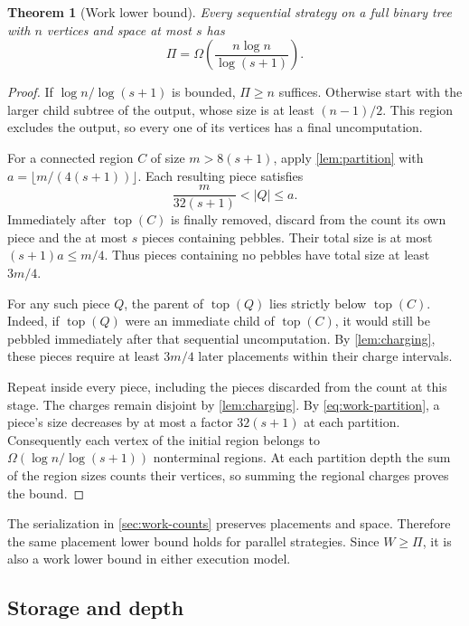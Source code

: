 \documentclass[11pt]{article}
\newtheorem{theorem}{Theorem}[section]
\theoremstyle{definition}
\theoremstyle{remark}
\DeclareMathOperator{\topv}{top}
\begin{document}
\begin{theorem}[Work lower bound]
\label{thm:universal-work}
Every sequential strategy on a full binary tree with $n$ vertices and space at most $s$ has
\begin{equation}
\Pi=\Omega\!\left(\frac{n\log n}{\log(s+1)}\right).
\label{eq:universal-work}
\end{equation}
\end{theorem}
\begin{proof}
If $\log n/\log(s+1)$ is bounded, $\Pi\ge n$ suffices. Otherwise start with the larger child subtree of the output, whose size is at least $(n-1)/2$. This region excludes the output, so every one of its vertices has a final uncomputation.

For a connected region $C$ of size $m>8(s+1)$, apply \cref{lem:partition} with $a=\lfloor m/(4(s+1))\rfloor$. Each resulting piece satisfies
\begin{equation}
 \frac{m}{32(s+1)}<|Q|\le a.
 \label{eq:work-partition}
\end{equation}
Immediately after $\topv(C)$ is finally removed, discard from the count its own piece and the at most $s$ pieces containing pebbles. Their total size is at most $(s+1)a\le m/4$. Thus pieces containing no pebbles have total size at least $3m/4$.

For any such piece $Q$, the parent of $\topv(Q)$ lies strictly below $\topv(C)$. Indeed, if $\topv(Q)$ were an immediate child of $\topv(C)$, it would still be pebbled immediately after that sequential uncomputation. By \cref{lem:charging}, these pieces require at least $3m/4$ later placements within their charge intervals.

Repeat inside every piece, including the pieces discarded from the count at this stage. The charges remain disjoint by \cref{lem:charging}. By \cref{eq:work-partition}, a piece's size decreases by at most a factor $32(s+1)$ at each partition. Consequently each vertex of the initial region belongs to $\Omega(\log n/\log(s+1))$ nonterminal regions. At each partition depth the sum of the region sizes counts their vertices, so summing the regional charges proves the bound.
\end{proof}

The serialization in \cref{sec:work-counts} preserves placements and space. Therefore the same placement lower bound holds for parallel strategies. Since $W\ge\Pi$, it is also a work lower bound in either execution model.

\subsection{Storage and depth}
\label{sec:area}
\end{document}
